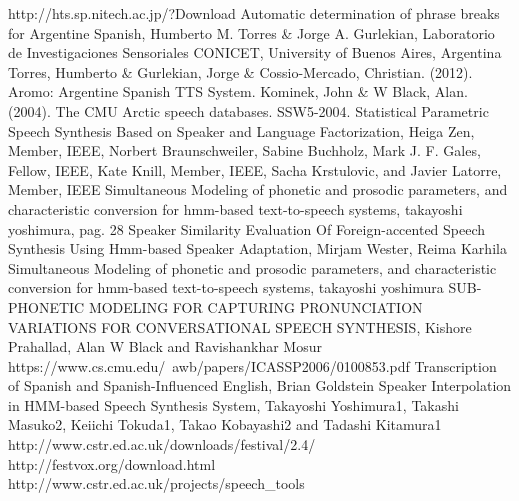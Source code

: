 \begin{thebibliography}{9}
 http://hts.sp.nitech.ac.jp/?Download
 Automatic determination of phrase breaks for Argentine Spanish, Humberto M. Torres \& Jorge A. Gurlekian, Laboratorio de Investigaciones Sensoriales CONICET, University of Buenos Aires, Argentina
 Torres, Humberto \& Gurlekian, Jorge \& Cossio-Mercado, Christian. (2012). Aromo: Argentine Spanish TTS System.
 Kominek, John \& W Black, Alan. (2004). The CMU Arctic speech databases. SSW5-2004.
 Statistical Parametric Speech Synthesis Based on Speaker and Language Factorization, Heiga Zen, Member, IEEE, Norbert Braunschweiler, Sabine Buchholz, Mark J. F. Gales, Fellow, IEEE, Kate Knill, Member, IEEE, Sacha Krstulovic, and Javier Latorre, Member, IEEE
 Simultaneous Modeling of phonetic and prosodic parameters, and characteristic conversion for hmm-based text-to-speech systems, takayoshi yoshimura, pag. 28
 Speaker Similarity Evaluation Of Foreign-accented Speech Synthesis Using Hmm-based Speaker Adaptation, Mirjam Wester, Reima Karhila
 Simultaneous Modeling of phonetic and prosodic parameters, and characteristic conversion for hmm-based text-to-speech systems, takayoshi yoshimura
 SUB-PHONETIC MODELING FOR CAPTURING PRONUNCIATION VARIATIONS FOR CONVERSATIONAL SPEECH SYNTHESIS, Kishore Prahallad, Alan W Black and Ravishankhar Mosur https://www.cs.cmu.edu/~awb/papers/ICASSP2006/0100853.pdf
 Transcription of Spanish and Spanish-Influenced English, Brian Goldstein
 Speaker Interpolation in HMM-based Speech Synthesis System, Takayoshi Yoshimura1, Takashi Masuko2, Keiichi Tokuda1, Takao Kobayashi2 and Tadashi Kitamura1
 http://www.cstr.ed.ac.uk/downloads/festival/2.4/
 http://festvox.org/download.html
 http://www.cstr.ed.ac.uk/projects/speech\_tools
\end{thebibliography}